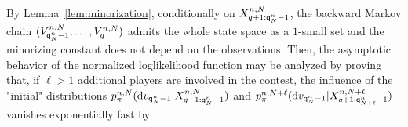 By Lemma~\ref{lem:minorization}, conditionally on $X_{q+1:{\mathsf{q}}^{n}_{N}-1}^{n,N}$, the backward Markov chain $(V_{{\mathsf{q}}^{n}_{N}-1}^{n,N},\ldots,V_{q}^{n,N})$ admits the whole state space as a $1$-small set and the minorizing constant does not depend on the observations. Then, the asymptotic behavior of the normalized loglikelihood function may be analyzed by proving that, if $\ell>1$ additional players are involved in the contest, the influence of the "initial" distributions $p_{\pi}^{n,N}(\mathrm{d} v_{{\mathsf{q}}^{n}_{N}-1}|X^{n,N}_{q+1:{\mathsf{q}}^{n}_{N}-1})$ and $p_{\pi}^{n,N+\ell}(\mathrm{d} v_{{\mathsf{q}}^{n}_{N}-1}|X^{n,N+\ell}_{q+1:{\mathsf{q}}^{n}_{N+\ell}-1})$ vanishes exponentially fast by \cite{lindvall:1992}.


